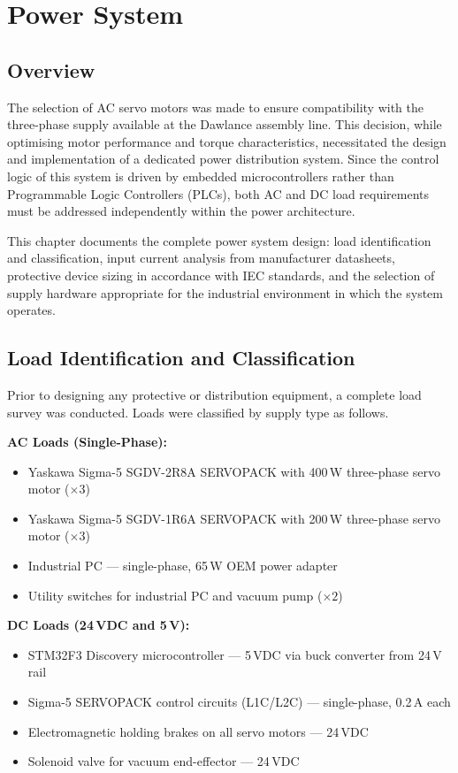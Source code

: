 \chapter{Power System}
\label{ch:power}

\section{Overview}

The selection of AC servo motors was made to ensure compatibility with the three-phase supply available at the Dawlance assembly line. This decision, while optimising motor performance and torque characteristics, necessitated the design and implementation of a dedicated power distribution system. Since the control logic of this system is driven by embedded microcontrollers rather than Programmable Logic Controllers (PLCs), both AC and DC load requirements must be addressed independently within the power architecture.

This chapter documents the complete power system design: load identification and classification, input current analysis from manufacturer datasheets, protective device sizing in accordance with IEC standards, and the selection of supply hardware appropriate for the industrial environment in which the system operates.

\section{Load Identification and Classification}

Prior to designing any protective or distribution equipment, a complete load survey was conducted. Loads were classified by supply type as follows.

\textbf{AC Loads (Single-Phase):}
\begin{itemize}
    \item Yaskawa Sigma-5 SGDV-2R8A SERVOPACK with 400\,W three-phase servo motor ($\times 3$)
    \item Yaskawa Sigma-5 SGDV-1R6A SERVOPACK with 200\,W three-phase servo motor ($\times 3$)
    \item Industrial PC --- single-phase, 65\,W OEM power adapter
    \item Utility switches for industrial PC and vacuum pump ($\times 2$)
\end{itemize}

\textbf{DC Loads (24\,VDC and 5\,V):}
\begin{itemize}
    \item STM32F3 Discovery microcontroller --- 5\,VDC via buck converter from 24\,V rail
    \item Sigma-5 SERVOPACK control circuits (L1C/L2C) --- single-phase, 0.2\,A each
    \item Electromagnetic holding brakes on all servo motors --- 24\,VDC
    \item Solenoid valve for vacuum end-effector --- 24\,VDC
\end{itemize}

